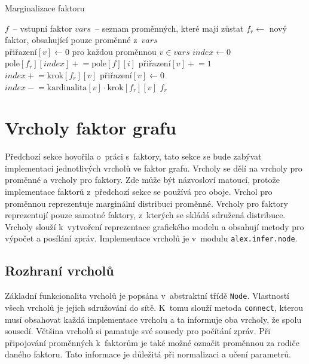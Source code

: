 \begin{algorithm}
\caption{Marginalizace faktoru}
\label{alg:marg}
\begin{algorithmic}
\State $f$~-- vstupní faktor
\State $vars$~-- seznam proměnných, které mají zůstat
\State
\State $f_r \gets$ nový faktor, obsahující pouze proměnné z~$vars$
\State $\text{přiřazení}[v] \gets 0 \text{ pro každou proměnnou } v \in vars$
\State $index \gets 0$ 
\State
{}
	\State $\text{pole}[f_r][index] \mathrel{+}= \text{pole}[f][i]$
	\State
			\State $\text{přiřazení}[v] \mathrel{+}= 1$
			\State $index \mathrel{+}= \text{krok}[f_r][v]$
		\EndIf
		\State
			\State $\text{přiřazení}[v] \gets 0$
			\State $index \mathrel{-}= \text{kardinalita}[v] \cdot \text{krok}[f_r][v]$
		\EndIf
	\EndFor
\EndFor
\State \Return $f_r$
\EndFunction
\end{algorithmic}
\end{algorithm}

\section{Vrcholy faktor grafu}

Předchozí sekce hovořila o~práci s~faktory, tato sekce se bude zabývat implementací jednotlivých vrcholů ve faktor grafu.
Vrcholy se dělí na vrcholy pro proměnné a vrcholy pro faktory.
Zde může být názvosloví matoucí, protože implementace faktorů z~předchozí sekce se používá pro oboje.
Vrchol pro proměnnou reprezentuje marginální distribuci proměnné.
Vrcholy pro faktory reprezentují pouze samotné faktory, z~kterých se skládá sdružená distribuce.
Vrcholy slouží k~vytvoření reprezentace grafického modelu a obsahují metody pro výpočet a posílání zpráv.
Implementace vrcholů je v~modulu \texttt{alex.infer.node}.

\subsection{Rozhraní vrcholů}

Základní funkcionalita vrcholů je popsána v~abstraktní třídě \texttt{Node}.
Vlastností všech vrcholů je jejich sdružování do sítě.
K~tomu slouží metoda \texttt{connect}, kterou musí obsahovat každá implementace vrcholu a ta informuje oba vrcholy, že spolu sousedí.
Většina vrcholů si pamatuje své sousedy pro počítání zpráv.
Při připojování proměnných k~faktorům je také možné označit proměnnou za rodiče daného faktoru.
Tato informace je důležitá při normalizaci a učení parametrů.


